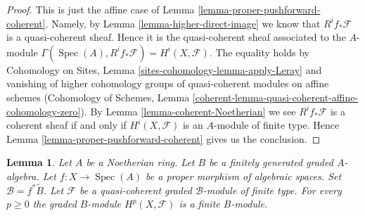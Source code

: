 \documentclass{stacks-project}
\theoremstyle{plain}
\newtheorem{lemma}[subsection]{Lemma}
\theoremstyle{definition}
\theoremstyle{remark}
\numberwithin{equation}{subsection}
\def\Spec{\mathop{\mathrm{Spec}}}
\begin{document}
\begin{proof}
This is just the affine case of Lemma \ref{lemma-proper-pushforward-coherent}.
Namely, by Lemma \ref{lemma-higher-direct-image} we know that
$R^if_*\mathcal{F}$ is a quasi-coherent sheaf. Hence it is the quasi-coherent
sheaf associated to the $A$-module
$\Gamma(\Spec(A), R^if_*\mathcal{F}) = H^i(X, \mathcal{F})$.
The equality holds by
Cohomology on Sites, Lemma \ref{sites-cohomology-lemma-apply-Leray}
and vanishing of higher cohomology groups of quasi-coherent modules
on affine schemes (Cohomology of Schemes, Lemma
\ref{coherent-lemma-quasi-coherent-affine-cohomology-zero}).
By Lemma \ref{lemma-coherent-Noetherian} we see $R^if_*\mathcal{F}$ is
a coherent sheaf if and only if $H^i(X, \mathcal{F})$
is an $A$-module of finite type. Hence
Lemma \ref{lemma-proper-pushforward-coherent} gives us the conclusion.
\end{proof}

\begin{lemma}
\label{lemma-graded-finiteness}
Let $A$ be a Noetherian ring.
Let $B$ be a finitely generated graded $A$-algebra.
Let $f : X \to \Spec(A)$ be a proper morphism of algebraic spaces.
Set $\mathcal{B} = f^*\widetilde B$.
Let $\mathcal{F}$ be a quasi-coherent
graded $\mathcal{B}$-module of finite type.
For every $p \geq 0$ the graded $B$-module $H^p(X, \mathcal{F})$
is a finite $B$-module.
\end{lemma}
\end{document}
